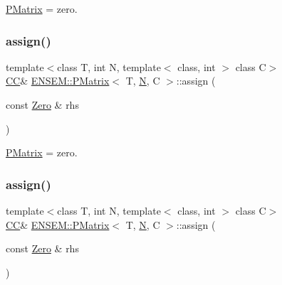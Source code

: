 \mbox{\hyperlink{classENSEM_1_1PMatrix}{P\+Matrix}} = zero. 

\mbox{\label{classENSEM_1_1PMatrix_a4d8aeb469d2295dc8c555a0180ab0613}} 
\subsubsection{\texorpdfstring{assign()}{assign()}\hspace{0.1cm}{\footnotesize\ttfamily [2/9]}}
{\footnotesize\ttfamily template$<$class T, int N, template$<$ class, int $>$ class C$>$ \\
\mbox{\hyperlink{classENSEM_1_1PMatrix_a744bac549029029effe32dc1705660ec}{CC}}\& \mbox{\hyperlink{classENSEM_1_1PMatrix}{E\+N\+S\+E\+M\+::\+P\+Matrix}}$<$ T, \mbox{\hyperlink{adat__devel_2lib_2hadron_2operator__name__util_8cc_a7722c8ecbb62d99aee7ce68b1752f337}{N}}, C $>$\+::assign (\begin{DoxyParamCaption}\item[{const \mbox{\hyperlink{structENSEM_1_1Zero}{Zero}} \&}]{rhs }\end{DoxyParamCaption})\hspace{0.3cm}{\ttfamily [inline]}}



\mbox{\hyperlink{classENSEM_1_1PMatrix}{P\+Matrix}} = zero. 

\mbox{\label{classENSEM_1_1PMatrix_a4d8aeb469d2295dc8c555a0180ab0613}} 
\subsubsection{\texorpdfstring{assign()}{assign()}\hspace{0.1cm}{\footnotesize\ttfamily [3/9]}}
{\footnotesize\ttfamily template$<$class T, int N, template$<$ class, int $>$ class C$>$ \\
\mbox{\hyperlink{classENSEM_1_1PMatrix_a744bac549029029effe32dc1705660ec}{CC}}\& \mbox{\hyperlink{classENSEM_1_1PMatrix}{E\+N\+S\+E\+M\+::\+P\+Matrix}}$<$ T, \mbox{\hyperlink{adat__devel_2lib_2hadron_2operator__name__util_8cc_a7722c8ecbb62d99aee7ce68b1752f337}{N}}, C $>$\+::assign (\begin{DoxyParamCaption}\item[{const \mbox{\hyperlink{structENSEM_1_1Zero}{Zero}} \&}]{rhs }\end{DoxyParamCaption})\hspace{0.3cm}{\ttfamily [inline]}}



